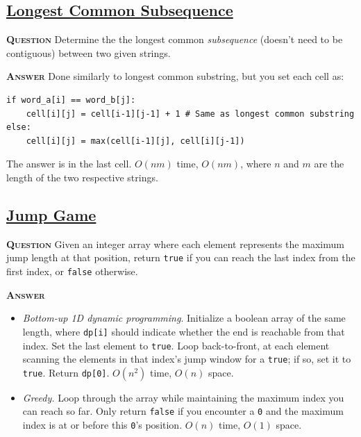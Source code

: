 \documentclass[table, xcdraw]{article}%
\begin{document}
\subsection{\href{https://leetcode.com/problems/longest-common-subsequence}{Longest Common Subsequence}}

\textsc{\textbf{Question}} Determine the the longest common \emph{subsequence} (doesn't need to be contiguous) between two given strings.

\textsc{\textbf{Answer}} Done similarly to longest common substring, but you set each cell as:

\begin{verbatim}
if word_a[i] == word_b[j]:
    cell[i][j] = cell[i-1][j-1] + 1 # Same as longest common substring
else:
    cell[i][j] = max(cell[i-1][j], cell[i][j-1])
\end{verbatim}

The answer is in the last cell. $O(nm)$ time, $O(nm)$, where $n$ and $m$ are the length of the two respective strings.

\subsection{\href{https://leetcode.com/problems/jump-game}{Jump Game}}

\textsc{\textbf{Question}} Given an integer array where each element represents the maximum jump length at that position, return \texttt{true} if you can reach the last index from the first index, or \texttt{false} otherwise.

\textsc{\textbf{Answer}}

\begin{itemize}
    \item \textit{Bottom-up 1D dynamic programming}. Initialize a boolean array of the same length, where \texttt{dp[i]} should indicate whether the end is reachable from that index. Set the last element to \texttt{true}. Loop back-to-front, at each element scanning the elements in that index's jump window for a \texttt{true}; if so, set it to \texttt{true}. Return \texttt{dp[0]}. $O(n^2)$ time, $O(n)$ space.
    \item \textit{Greedy.} Loop through the array while maintaining the maximum index you can reach so far. Only return \texttt{false} if you encounter a \texttt{0} and the maximum index is at or before this \texttt{0}'s position. $O(n)$ time, $O(1)$ space.
\end{itemize}
\end{document}
